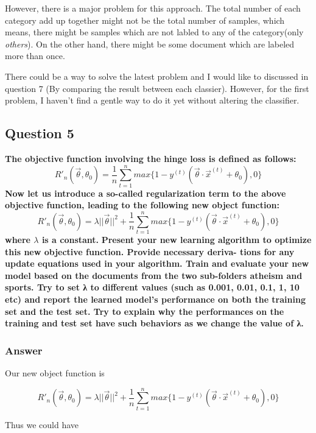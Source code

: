 \documentclass{article}
\begin{document}
However, there is a major problem for this approach. The total number of each category add up together might not be the total number of samples, which means, there might be samples which are not labled to any of the category(only \emph{others}). On the other hand, there might be some document which are labeled more than once.

There could be a way to solve the latest problem and I would like to discussed in question 7 (By comparing the result between each classier). However, for the first problem, I haven't find a gentle way to do it yet without altering the classifier.

\subsection{Question 5}
\label{sec-1-5}

\textbf{The objective function involving the hinge loss is defined as follows:}
$$
R'_n(\vec{\theta}, \theta_0) = \frac{1}{n} \sum_{t=1}^n max \{ 1 - y^{(t)}(\vec{\theta} \cdot \vec{x}^{(t)} + \theta_0), 0 \} 
$$
\textbf{Now let us introduce a so-called regularization term to the above objective function, leading to the following new object function:}
$$
R'_n(\vec{\theta}, \theta_0) = \lambda ||\vec{\theta}||^2 + \frac{1}{n} \sum_{t=1}^n max \{ 1 - y^{(t)}(\vec{\theta} \cdot \vec{x}^{(t)} + \theta_0), 0  \} 
$$
\textbf{where $\lambda$ is a constant.}
\textbf{Present your new learning algorithm to optimize this new objective function. Provide necessary deriva- tions for any update equations used in your algorithm. Train and evaluate your new model based on the documents from the two sub-folders atheism and sports. Try to set λ to different values (such as 0.001, 0.01, 0.1, 1, 10 etc) and report the learned model’s performance on both the training set and the test set. Try to explain why the performances on the training and test set have such behaviors as we change the value of λ.}

\subsubsection{Answer}
\label{sec-1-5-1}

Our new object function is  

$$
R'_n(\vec{\theta}, \theta_0) = \lambda ||\vec{\theta}||^2 + \frac{1}{n} \sum_{t=1}^n max \{ 1 - y^{(t)}(\vec{\theta} \cdot \vec{x}^{(t)} + \theta_0), 0 \} 
$$

Thus we could have 
\end{document}

